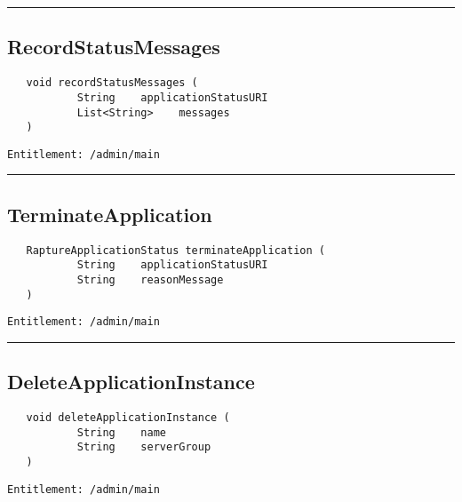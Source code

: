 \rule{12cm}{2pt}
\subsection{RecordStatusMessages}
\label{Api:RecordStatusMessages}
\begin{verbatim}
   void recordStatusMessages (
           String    applicationStatusURI
           List<String>    messages
   )
\end{verbatim}
\begin{Verbatim}[fontsize=\small, formatcom=\color{Maroon}]
  Entitlement: /admin/main
\end{Verbatim}



\rule{12cm}{2pt}
\subsection{TerminateApplication}
\label{Api:TerminateApplication}
\begin{verbatim}
   RaptureApplicationStatus terminateApplication (
           String    applicationStatusURI
           String    reasonMessage
   )
\end{verbatim}
\begin{Verbatim}[fontsize=\small, formatcom=\color{Maroon}]
  Entitlement: /admin/main
\end{Verbatim}



\rule{12cm}{2pt}
\subsection{DeleteApplicationInstance}
\label{Api:DeleteApplicationInstance}
\begin{verbatim}
   void deleteApplicationInstance (
           String    name
           String    serverGroup
   )
\end{verbatim}
\begin{Verbatim}[fontsize=\small, formatcom=\color{Maroon}]
  Entitlement: /admin/main
\end{Verbatim}



